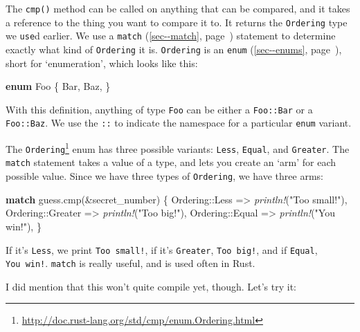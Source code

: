 \documentclass[a4paper,]{book}
\renewcommand*{\hyperref}[2][\ar]{%
  \def\ar{#2}%
  #2 (\autoref{#1}, page~\pageref{#1})}
\newenvironment{Shaded}{\begin{snugshade}}{\end{snugshade}}
\newcommand{\KeywordTok}[1]{\textcolor[rgb]{0.13,0.29,0.53}{\textbf{{#1}}}}
\newcommand{\StringTok}[1]{\textcolor[rgb]{0.31,0.60,0.02}{{#1}}}
\newcommand{\PreprocessorTok}[1]{\textcolor[rgb]{0.56,0.35,0.01}{\textit{{#1}}}}
\newcommand{\NormalTok}[1]{{#1}}
\renewcommand{\href}[2]{#2\footnote{\url{#1}}}
\begin{document}
The \texttt{cmp()} method can be called on anything that can be
compared, and it takes a reference to the thing you want to compare it
to. It returns the \texttt{Ordering} type we \texttt{use}d earlier. We
use a \hyperref[sec--match]{\texttt{match}} statement to determine
exactly what kind of \texttt{Ordering} it is. \texttt{Ordering} is an
\hyperref[sec--enums]{\texttt{enum}}, short for `enumeration', which
looks like this:

\begin{Shaded}
\begin{Highlighting}[]
\KeywordTok{enum} \NormalTok{Foo \{}
    \NormalTok{Bar,}
    \NormalTok{Baz,}
\NormalTok{\}}
\end{Highlighting}
\end{Shaded}

With this definition, anything of type \texttt{Foo} can be either a
\texttt{Foo::Bar} or a \texttt{Foo::Baz}. We use the \texttt{::} to
indicate the namespace for a particular \texttt{enum} variant.

The
\href{http://doc.rust-lang.org/std/cmp/enum.Ordering.html}{\texttt{Ordering}}
enum has three possible variants: \texttt{Less}, \texttt{Equal}, and
\texttt{Greater}. The \texttt{match} statement takes a value of a type,
and lets you create an `arm' for each possible value. Since we have
three types of \texttt{Ordering}, we have three arms:

\begin{Shaded}
\begin{Highlighting}[]
\KeywordTok{match} \NormalTok{guess.cmp(&secret_number) \{}
    \NormalTok{Ordering::Less    => }\PreprocessorTok{println!}\NormalTok{(}\StringTok{"Too small!"}\NormalTok{),}
    \NormalTok{Ordering::Greater => }\PreprocessorTok{println!}\NormalTok{(}\StringTok{"Too big!"}\NormalTok{),}
    \NormalTok{Ordering::Equal   => }\PreprocessorTok{println!}\NormalTok{(}\StringTok{"You win!"}\NormalTok{),}
\NormalTok{\}}
\end{Highlighting}
\end{Shaded}

If it's \texttt{Less}, we print \texttt{Too\ small!}, if it's
\texttt{Greater}, \texttt{Too\ big!}, and if \texttt{Equal},
\texttt{You\ win!}. \texttt{match} is really useful, and is used often
in Rust.

I did mention that this won't quite compile yet, though. Let's try it:
\end{document}
